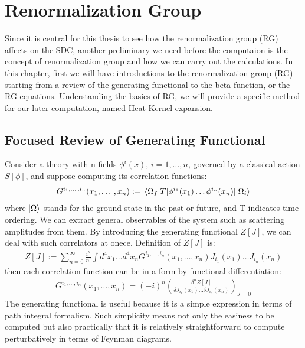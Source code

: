 \chapter{Renormalization Group}
\label{RG}
Since it is central for this thesis to see how the renormalization group (RG) affects on the SDC, another preliminary we need before the computaion is the concept of renormalization group and how we can carry out the calculations. In this chapter, first we will have introductions to the renormalization group (RG) starting from a review of the generating functional to the beta function, or the RG equations. Understanding the basics of RG, we will provide a specific method for our later computation, named Heat Kernel expansion.

\section{Focused Review of Generating Functional}
Consider a theory with n fields $\phi^{i} (x)$, $i = 1, \dotso , n$, governed by a classical action $S[\phi]$, and suppose computing its correlation functions:
\begin{align}
    G^{i_{1}, \dotso , i_{n}} (x_{1}, \dotso ,x_{n} ) := \mel{\Omega _{f}}{T[\phi^{i_{1}}(x_{1}) \dots \phi^{i_{n}} (x_{n})]}{\Omega _{i}}
\end{align}
where $\ket{\Omega}$ stands for the ground state in the past or future, and T indicates time ordering. We can extract general observables of the system such as scattering amplitudes from them. By introducing the generating functional $Z[J]$, we can deal with such correlators at onece. Definition of $Z[J]$ is:
\begin{align}
    Z[J] := \sum_{n=0} ^{\infty} \frac{i^{n}}{n!} \int d^{4}x_{1} \dotso d^{4}x_{n}   G^{i_{1}, \dotso , i_{n}} (x_{1}, \dotso ,x_{n} ) J_{i_{1}}(x_{1}) \dots J_{{i_{n}}}(x_{n})
\end{align}
then each correlation function can be in a form by functional differentiation:
\begin{align}
    G^{i_{1}, \dotso , i_{n}} (x_{1}, \dotso ,x_{n} ) = (-i)^{n} (\frac{\delta^{n}Z[J]}{\delta J_{i_{1}}(x_{1}) \dots \delta J_{i_n} (x_{n})}) _{J=0}
\end{align}
The generating functional is useful because it is a simple expression in terms of path integral formalism. Such simplicity means not only the easiness to be computed but also practically that it is relatively straightforward to compute perturbatively in terms of Feynman diagrams. 
